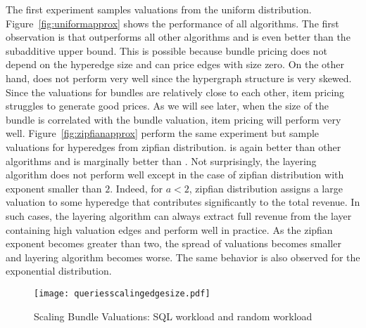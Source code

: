 \smallskip
{} The first experiment samples valuations from the uniform distribution. Figure~\ref{fig:uniformapprox} shows the performance of all algorithms. The first observation is that \ubp outperforms all other algorithms and is even better than the subadditive upper bound. This is possible because bundle pricing does not depend on the hyperedge size and can price edges with size zero. On the other hand, \lpip does not perform very well since the hypergraph structure is very skewed. Since the valuations for bundles are relatively close to each other, item pricing struggles to generate good prices. As we will see later, when the size of the bundle is correlated with the bundle valuation, item pricing will perform very well.  Figure~\ref{fig:zipfianapprox} perform the same experiment but sample valuations for hyperedges from zipfian distribution. \ubp is again better than other algorithms and \cip is marginally better than \lpip. Not surprisingly, the layering algorithm does not perform well except in the case of zipfian distribution with exponent smaller than $2$. Indeed, for $a < 2$, zipfian distribution assigns a large valuation to some hyperedge that contributes significantly to the total revenue. In such cases, the layering algorithm can always extract full revenue from the layer containing high valuation edges and perform well in practice. As the zipfian exponent becomes greater than two, the spread of valuations becomes smaller and layering algorithm becomes worse. The same behavior is also observed for the exponential distribution. 

\begin{figure}[!t]
	\centering
	\texttt{[image: queriesscalingedgesize.pdf]}
	\caption{Scaling Bundle Valuations: SQL workload and random workload} \label{fig:scalingedge}
\end{figure}  

